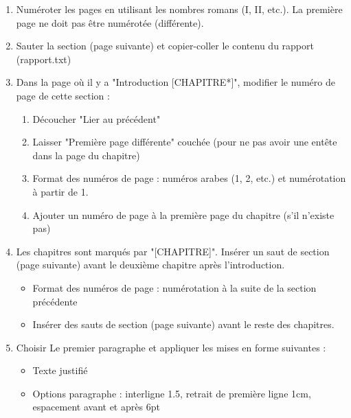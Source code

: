\documentclass[11pt, a4paper]{article}
\begin{document}
\begin{enumerate}
	\item Numéroter les pages en utilisant les nombres romans (I, II, etc.). La première page ne doit pas être numérotée (différente).
	\item Sauter la section (page suivante) et copier-coller le contenu du rapport (rapport.txt)
	\item Dans la page où il y a "Introduction [CHAPITRE*]", modifier le numéro de page de cette section : 
	\begin{multicols}{2}
	\begin{enumerate}
		\item Découcher "Lier au précédent" 
		\item Laisser "Première page différente" couchée (pour ne pas avoir une entête dans la page du chapitre) 
		\item Format des numéros de page : numéros arabes (1, 2, etc.) et numérotation à partir de 1.
		\item Ajouter un numéro de page à la première page du chapitre (s'il n'existe pas)
	\end{enumerate}
	\end{multicols}
	
	\item Les chapitres sont marqués par "[CHAPITRE]". Insérer un saut de section (page suivante) avant le deuxième chapitre après l'introduction. 
	\begin{itemize}
		\item Format des numéros de page : numérotation à la suite de la section précédente
		\item Insérer des sauts de section (page suivante) avant le reste des chapitres. 
	\end{itemize}

	\item Choisir Le premier paragraphe et appliquer les mises en forme suivantes : 
	\begin{itemize}
		\item Texte justifié 
		\item Options paragraphe : interligne 1.5, retrait de première ligne 1cm, espacement avant et après 6pt
	\end{itemize}


\end{enumerate}
\end{document}

